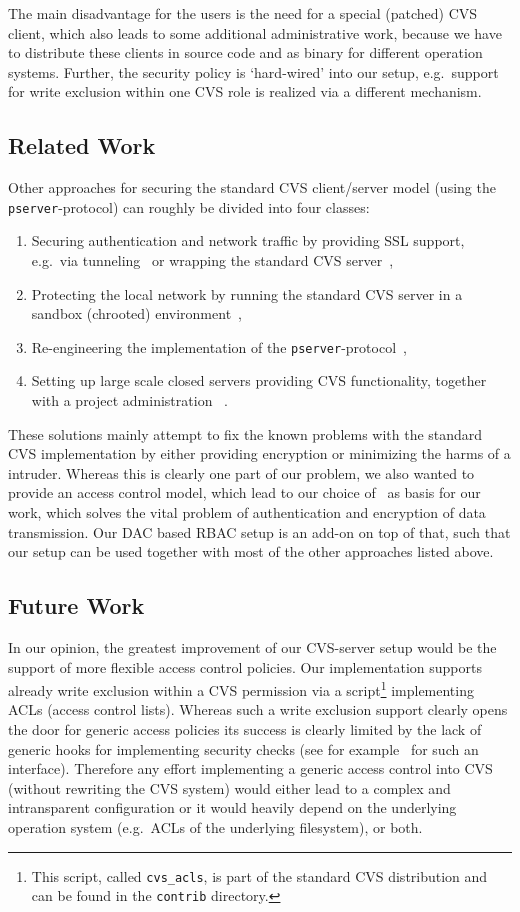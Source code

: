 The main disadvantage for the users is the need for a special (patched) CVS
client, which also leads to some additional administrative work, because we have
to distribute these clients in source code and as binary for different operation
systems. Further, the security policy is `hard-wired' into our setup, e.g.\ 
support for write exclusion within one CVS role is realized via a different
mechanism.

\subsection{Related Work}
Other approaches for securing the standard CVS client/server model (using the
\texttt{pserver}-protocol) can roughly be divided into four classes:
\begin{enumerate}
\item Securing authentication and network traffic by providing SSL
  support, e.g.\ via tunneling~\cite{berezin:tunnel:2001} or wrapping
  the standard CVS server~\cite{vogt:cvsauth:2001},
\item Protecting the local network by running the standard CVS server in a
  sandbox (chrooted) environment~\cite{hess:anonymous:2001,idealx:chroot:2001},
\item Re-engineering the implementation of the
  \texttt{pserver}-protocol~\cite{nserver},
\item Setting up large scale closed servers providing CVS functionality, together with
  a project administration ~\cite{fsf:savannah:2001,osdn:sourceforge:2001}.
\end{enumerate}
These solutions mainly attempt to fix the known problems with the standard
CVS implementation by either providing encryption or minimizing the harms of a
intruder.  Whereas this is clearly one part of our problem, we also wanted to
provide an access control model, which lead to our choice
of~\cite{vogt:cvsauth:2001} as basis for our work, which solves the vital
problem of authentication and encryption of data transmission. Our DAC based
RBAC setup is an add-on on top of that, such that our setup can be used
together with most of the other approaches listed above.
\subsection{Future Work}
In our opinion, the greatest improvement of our CVS-server setup would be the
support of more flexible access control policies. Our implementation supports
already write exclusion within a CVS permission via a script\footnote{This script,
  called \texttt{cvs\_acls}, is part of the standard CVS distribution and can be
  found in the \texttt{contrib} directory.} implementing ACLs (access control
lists). Whereas such a write exclusion support clearly opens the door for
generic access policies its success is clearly limited by the lack of generic
hooks for implementing security checks (see for example~\cite{Linux-LSM} for
such an interface). Therefore any effort implementing a generic access control
into CVS (without rewriting the CVS system) would either lead to a complex and
intransparent configuration or it would heavily depend on the
underlying operation system (e.g.\ ACLs of the underlying filesystem), or both.

